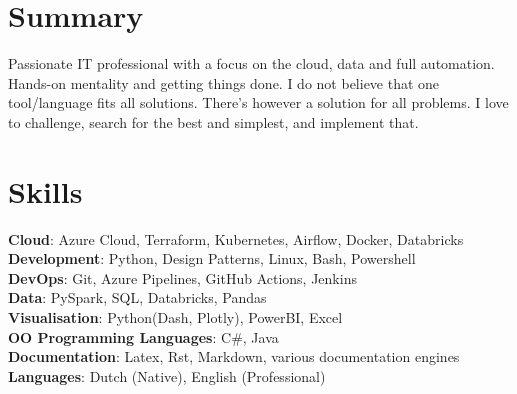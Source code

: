 \documentclass[A4,11pt]{article}
\begin{document}

\section{Summary}

Passionate IT professional with a focus on the cloud, data and full automation. Hands-on mentality and getting things done. I do not believe that one tool/language fits all solutions. There's however a solution for all problems. I love to challenge, search for the best and simplest, and implement that.

\section{Skills}
 \begin{itemize}[leftmargin=0.5cm, label={}]
    \small{\item{
     \textbf{Cloud}{: Azure Cloud, Terraform, Kubernetes, Airflow, Docker, Databricks} \\
     \textbf{Development}{: Python, Design Patterns, Linux, Bash, Powershell} \\
     \textbf{DevOps}{: Git, Azure Pipelines, GitHub Actions, Jenkins} \\
     \textbf{Data}{: PySpark, SQL, Databricks, Pandas} \\
     \textbf{Visualisation}{: Python(Dash, Plotly), PowerBI, Excel} \\
     \textbf{OO Programming Languages}{: C\#, Java} \\
     \textbf{Documentation}{: Latex, Rst, Markdown, various documentation engines} \\
     \textbf{Languages}{: Dutch (Native), English (Professional)} \\
    }}
 \end{itemize}
\end{document}
